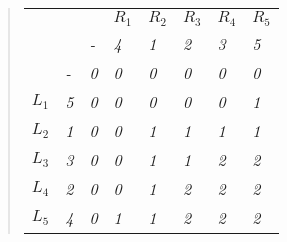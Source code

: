 \begin{quote}
    \begin{table}[H]
        \centering
        \begin{tabular}{llllllll}
            \textit{}      & \textit{}                       & \textit{}                       & \textit{$R_1$}                  & \textit{$R_2$}                  & \textit{$R_3$}                  & \textit{$R_4$}                  & \textit{$R_5$}                  \\
            \textit{}      & \textit{}                       & \textit{-}                      & \textit{4}                      & \textit{1}                      & \textit{2}                      & \textit{3}                      & \textit{5}                      \\ \cline{3-8} 
            \textit{}      & \multicolumn{1}{l|}{\textit{-}} & \multicolumn{1}{l|}{\textit{0}} & \multicolumn{1}{l|}{\textit{0}} & \multicolumn{1}{l|}{\textit{0}} & \multicolumn{1}{l|}{\textit{0}} & \multicolumn{1}{l|}{\textit{0}} & \multicolumn{1}{l|}{\textit{0}} \\ \cline{3-8} 
            \textit{$L_1$} & \multicolumn{1}{l|}{\textit{5}} & \multicolumn{1}{l|}{\textit{0}} & \multicolumn{1}{l|}{\textit{0}} & \multicolumn{1}{l|}{\textit{0}} & \multicolumn{1}{l|}{\textit{0}} & \multicolumn{1}{l|}{\textit{0}} & \multicolumn{1}{l|}{\textit{1}} \\ \cline{3-8} 
            \textit{$L_2$} & \multicolumn{1}{l|}{\textit{1}} & \multicolumn{1}{l|}{\textit{0}} & \multicolumn{1}{l|}{\textit{0}} & \multicolumn{1}{l|}{\textit{1}} & \multicolumn{1}{l|}{\textit{1}} & \multicolumn{1}{l|}{\textit{1}} & \multicolumn{1}{l|}{\textit{1}} \\ \cline{3-8} 
            \textit{$L_3$} & \multicolumn{1}{l|}{\textit{3}} & \multicolumn{1}{l|}{\textit{0}} & \multicolumn{1}{l|}{\textit{0}} & \multicolumn{1}{l|}{\textit{1}} & \multicolumn{1}{l|}{\textit{1}} & \multicolumn{1}{l|}{\textit{2}} & \multicolumn{1}{l|}{\textit{2}} \\ \cline{3-8} 
            \textit{$L_4$} & \multicolumn{1}{l|}{\textit{2}} & \multicolumn{1}{l|}{\textit{0}} & \multicolumn{1}{l|}{\textit{0}} & \multicolumn{1}{l|}{\textit{1}} & \multicolumn{1}{l|}{\textit{2}} & \multicolumn{1}{l|}{\textit{2}} & \multicolumn{1}{l|}{\textit{2}} \\ \cline{3-8} 
            \textit{$L_5$} & \multicolumn{1}{l|}{\textit{4}} & \multicolumn{1}{l|}{\textit{0}} & \multicolumn{1}{l|}{\textit{1}} & \multicolumn{1}{l|}{\textit{1}} & \multicolumn{1}{l|}{\textit{2}} & \multicolumn{1}{l|}{\textit{2}} & \multicolumn{1}{l|}{\textit{2}} \\ \cline{3-8} 
            \end{tabular}
    \end{table}


\end{quote}
